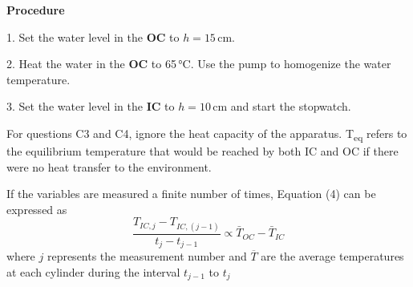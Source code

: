 \textbf{Procedure}

1. Set the water level in the \textbf{OC} to $h = 15\,\mathrm{cm}$.

2. Heat the water in the \textbf{OC} to 65\,°C. Use the pump to homogenize the
water temperature.

3. Set the water level in the \textbf{IC} to $h = 10\,\mathrm{cm}$ and start
the stopwatch.

\noindent{}

\noindent{}

For questions C3 and C4, ignore the heat capacity of the apparatus.
T\textsubscript{eq} refers to the equilibrium temperature that would be reached
by both IC and OC if there were no heat transfer to the environment.

\noindent{}

\noindent{}

If the variables are measured a finite number of times, Equation (4) can be
expressed as
\begin{equation}
\frac{T_{IC,j} - T_{IC,(j-1)}}{t_j - t_{j-1}} \propto \bar{T}_{OC} - \bar{T}_{IC} \tag{5}
\end{equation}
where $j$ represents the measurement number and $\overline{T}$ are the average
temperatures at each cylinder during the interval $t_{j-1}$ to $t_j$

\noindent{}

\noindent{}

